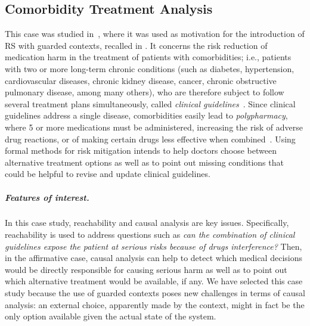 
\subsection{Comorbidity Treatment Analysis}\label{sec:cmsb2024}

This case was studied in~\cite{DBLP:conf/cmsb/BowlesBBFGM24}, where it was used as motivation for the introduction of RS with guarded contexts, recalled in . It concerns the risk reduction of medication harm in the treatment of patients with comorbidities; i.e., patients with two or more long-term chronic conditions (such as diabetes, hypertension, cardiovascular diseases, chronic kidney disease, cancer, chronic obstructive pulmonary disease, among many others), who are therefore subject to follow several treatment plans simultaneously, called \emph{clinical guidelines}~\cite{feder1999using,woolf1999potential}. Since clinical guidelines address a single disease, comorbidities easily lead to  \emph{polypharmacy}, where 5 or more medications must be administered, increasing the risk of adverse drug reactions, or of making certain drugs less effective when combined~\cite{Gut12}. Using formal methods for risk mitigation intends to help doctors choose between alternative treatment options as well as to point out missing conditions that could be helpful to revise and update clinical guidelines. 

\subparagraph*{Features of interest.}
In this case study, reachability and causal analysis are key issues.
Specifically, reachability is used to address questions such as \emph{can the combination of clinical guidelines expose the patient at serious risks because of drugs interference?}
Then, in the affirmative case, causal analysis can help to detect which medical decisions would be directly responsible for causing serious harm as well as to point out  which alternative treatment would be available, if any.
We have selected this case study because the use of guarded contexts poses new challenges in terms of causal analysis: an external choice, apparently made by the context, might in fact be the only option available given the actual state of the system. 

